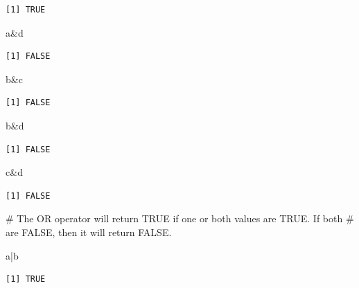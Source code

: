\documentclass[
  letterpaper,
  DIV=11,
  numbers=noendperiod]{scrreprt}
\newenvironment{Shaded}{\begin{snugshade}}{\end{snugshade}}
\newcommand{\CommentTok}[1]{\textcolor[rgb]{0.37,0.37,0.37}{#1}}
\newcommand{\NormalTok}[1]{\textcolor[rgb]{0.00,0.23,0.31}{#1}}
\newcommand{\SpecialCharTok}[1]{\textcolor[rgb]{0.37,0.37,0.37}{#1}}
\begin{document}
\begin{verbatim}
[1] TRUE
\end{verbatim}

\begin{Shaded}
\begin{Highlighting}[]
\NormalTok{a}\SpecialCharTok{\&}\NormalTok{d}
\end{Highlighting}
\end{Shaded}

\begin{verbatim}
[1] FALSE
\end{verbatim}

\begin{Shaded}
\begin{Highlighting}[]
\NormalTok{b}\SpecialCharTok{\&}\NormalTok{c}
\end{Highlighting}
\end{Shaded}

\begin{verbatim}
[1] FALSE
\end{verbatim}

\begin{Shaded}
\begin{Highlighting}[]
\NormalTok{b}\SpecialCharTok{\&}\NormalTok{d}
\end{Highlighting}
\end{Shaded}

\begin{verbatim}
[1] FALSE
\end{verbatim}

\begin{Shaded}
\begin{Highlighting}[]
\NormalTok{c}\SpecialCharTok{\&}\NormalTok{d}
\end{Highlighting}
\end{Shaded}

\begin{verbatim}
[1] FALSE
\end{verbatim}

\begin{Shaded}
\begin{Highlighting}[]
\CommentTok{\# The OR operator will return TRUE if one or both values are TRUE. If both}
\CommentTok{\# are FALSE, then it will return FALSE.}

\NormalTok{a}\SpecialCharTok{|}\NormalTok{b}
\end{Highlighting}
\end{Shaded}

\begin{verbatim}
[1] TRUE
\end{verbatim}
\end{document}
